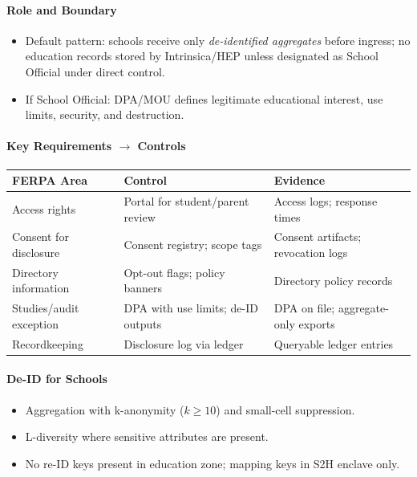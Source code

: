 \documentclass[11pt]{article}
\theoremstyle{plain}
\begin{document}
\paragraph{Role and Boundary}
\begin{itemize}
  \item Default pattern: schools receive only \emph{de-identified aggregates} before ingress; no education records stored by Intrinsica/HEP unless designated as School Official under direct control.
  \item If School Official: DPA/MOU defines legitimate educational interest, use limits, security, and destruction.
\end{itemize}

\paragraph{Key Requirements $\rightarrow$ Controls}
\begin{center}
\begin{tabular}{l l l}
\hline
FERPA Area & Control & Evidence \\
\hline
Access rights & Portal for student/parent review & Access logs; response times \\
Consent for disclosure & Consent registry; scope tags & Consent artifacts; revocation logs \\
Directory information & Opt-out flags; policy banners & Directory policy records \\
Studies/audit exception & DPA with use limits; de-ID outputs & DPA on file; aggregate-only exports \\
Recordkeeping & Disclosure log via ledger & Queryable ledger entries \\
\hline
\end{tabular}
\end{center}

\paragraph{De-ID for Schools}
\begin{itemize}
  \item Aggregation with k-anonymity ($k\ge 10$) and small-cell suppression.
  \item L-diversity where sensitive attributes are present.
  \item No re-ID keys present in education zone; mapping keys in S2H enclave only.
\end{itemize}
\end{document}
